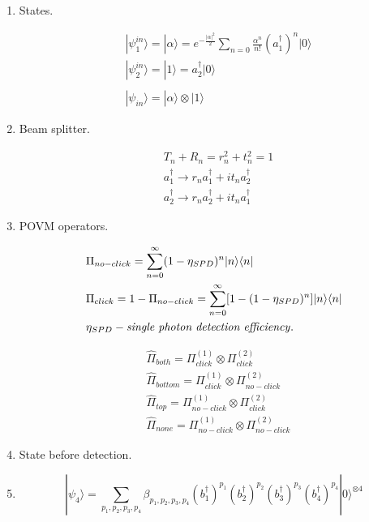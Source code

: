 \documentclass[12pt]{article}
\begin{document}
\begin{enumerate}
\item States.

\begin{align*}
& |\psi_{1}^{in}\rangle = |\alpha\rangle  = e^{-\frac{|\alpha|^2}{2}}  \sum_{n=0} \frac{\alpha^{n}}{n!}(a_{1}^{\dag})^{n} |0\rangle  \\ 
& |\psi_{2}^{in}\rangle = |1\rangle = a_{2}^{\dag} |0\rangle  \\
\\
& |\psi_{in}\rangle = |\alpha\rangle    \otimes   |1\rangle   
\end{align*}

\item Beam splitter.

\begin{align*}
&  T_{n} +  R_{n} = r_{n}^2 + t_{n}^2 = 1 \\
&  a_{1}^{\dag} \rightarrow  r_{n}a_{1}^{\dag} + it_{n}a_{2}^{\dag} \\
&  a_{2}^{\dag} \rightarrow  r_{n}a_{2}^{\dag} + it_{n}a_{1}^{\dag} 
\end{align*}


\item POVM operators.

\begin{align*}
&  \Pi_{no-click} = \sum_{n=0}^{\infty} (1-\eta_{SPD})^n  |n\rangle  \langle n|   \\
&  \Pi_{click} = 1 - \Pi_{no-click} = \sum_{n=0}^{\infty}[1 - (1-\eta_{SPD})^n]  |n\rangle  \langle n| \\
& \eta_{SPD} - \text{\textit{single photon detection efficiency}}.
\end{align*}



\begin{align*} 
 & \hat{\Pi}_{both} = \Pi_{click}^{(1)} \otimes  \Pi_{click}^{(2)}  \\
 & \hat{\Pi}_{bottom}  = \Pi_{click}^{(1)} \otimes  \Pi_{no-click}^{(2)} \\ 
 & \hat{\Pi}_{top}  = \Pi_{no-click}^{(1)} \otimes  \Pi_{click}^{(2)} \\
 &   \hat{\Pi}_{none}  = \Pi_{no-click}^{(1)} \otimes  \Pi_{no-click}^{(2)}
\end{align*}

\item State before detection.

\item $$ |\psi_4\rangle = \sum_{p_{1},p_{2},p_{3},p_{4}} \beta_{p_{1},p_{2},p_{3},p_{4}} (b_{1}^{\dag})^{p_{1}}  (b_{2}^{\dag})^{p_{2}} (b_{3}^{\dag})^{p_{3}}  (b_{4}^{\dag})^{p_{4}} |0\rangle^{\otimes 4} $$


\end{enumerate}
\end{document}
